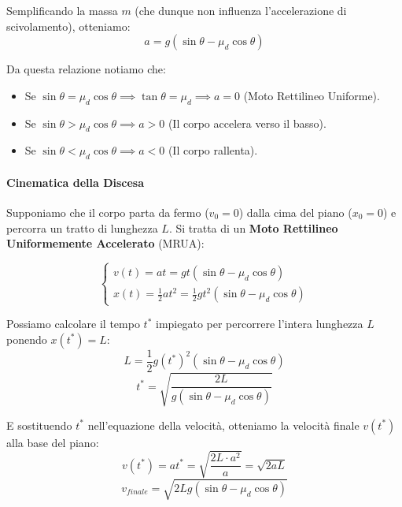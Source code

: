 Semplificando la massa $m$ (che dunque non influenza l'accelerazione di scivolamento), otteniamo:
\begin{equation}
    a = g (\sin\theta - \mu_d \cos\theta)
\end{equation}

Da questa relazione notiamo che:
\begin{itemize}
    \item Se $\sin\theta = \mu_d \cos\theta \implies \tan\theta = \mu_d \implies a=0$ (Moto Rettilineo Uniforme).
    \item Se $\sin\theta > \mu_d \cos\theta \implies a > 0$ (Il corpo accelera verso il basso).
    \item Se $\sin\theta < \mu_d \cos\theta \implies a < 0$ (Il corpo rallenta).
\end{itemize}

\paragraph{Cinematica della Discesa}
Supponiamo che il corpo parta da fermo ($v_0 = 0$) dalla cima del piano ($x_0 = 0$) e percorra un tratto di lunghezza $L$.
Si tratta di un \textbf{Moto Rettilineo Uniformemente Accelerato} (MRUA):

\begin{equation}
\begin{cases}
    v(t) = a t = g t (\sin\theta - \mu_d \cos\theta) \\
    x(t) = \frac{1}{2} a t^2 = \frac{1}{2} g t^2 (\sin\theta - \mu_d \cos\theta)
\end{cases}
\end{equation}

Possiamo calcolare il tempo $t^*$ impiegato per percorrere l'intera lunghezza $L$ ponendo $x(t^*) = L$:
\[ L = \frac{1}{2} g (t^*)^2 (\sin\theta - \mu_d \cos\theta) \]
\begin{equation}
    t^* = \sqrt{\frac{2L}{g(\sin\theta - \mu_d \cos\theta)}}
\end{equation}

E sostituendo $t^*$ nell'equazione della velocità, otteniamo la velocità finale $v(t^*)$ alla base del piano:
\[ v(t^*) = a t^* = \sqrt{\frac{2L \cdot a^2}{a}} = \sqrt{2 a L} \]
\begin{equation}
    v_{finale} = \sqrt{2 L g (\sin\theta - \mu_d \cos\theta)}
\end{equation}

